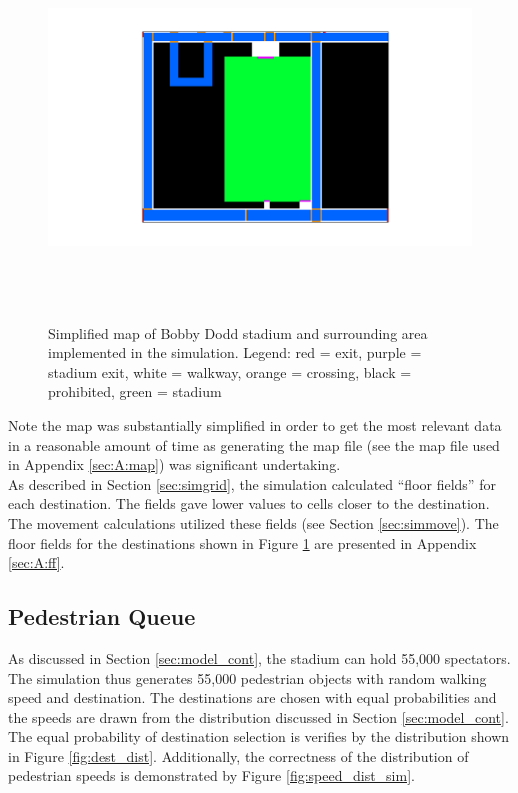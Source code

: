 \documentclass[paper=a4, fontsize=11pt]{scrartcl}
\numberwithin{equation}{section}		%
\numberwithin{figure}{section}			%
\numberwithin{table}{section}		    %
\begin{document}
\begin{figure}[H]
	\begin{center} 
		\includegraphics[trim=250 60 220 60, clip, height=4in, width=5.5in]{stadium_simulation_map} 
		\caption{Simplified map of Bobby Dodd stadium and surrounding area implemented in the 
		simulation. Legend: red = exit, purple = stadium exit, white = walkway, orange = crossing, 
		black = prohibited, green = stadium\label{fig:map}}
	\end{center} 
\end{figure}

\noindent
Note the map was substantially simplified in order to get the most relevant data in a reasonable 
amount of time as generating the map file (see the map file used in Appendix \ref{sec:A:map}) was 
significant undertaking.\\

\noindent
As described in Section \ref{sec:simgrid}, the simulation calculated ``floor fields'' for each 
destination. The fields gave lower values to cells closer to the destination. The movement 
calculations utilized these fields (see Section \ref{sec:simmove}). The floor fields for the 
destinations shown in Figure \ref{fig:map} are presented in Appendix \ref{sec:A:ff}.   

\subsection{Pedestrian Queue}
As discussed in Section \ref{sec:model_cont}, the stadium can hold 55,000 spectators. The 
simulation thus generates 55,000 pedestrian objects with random walking speed and destination. The 
destinations are chosen with equal probabilities and the speeds are drawn from the distribution 
discussed in Section \ref{sec:model_cont}. The equal probability of destination selection is 
verifies by the distribution shown in Figure \ref{fig:dest_dist}. Additionally, the correctness of 
the distribution of pedestrian speeds is demonstrated by Figure \ref{fig:speed_dist_sim}. 
\end{document}
